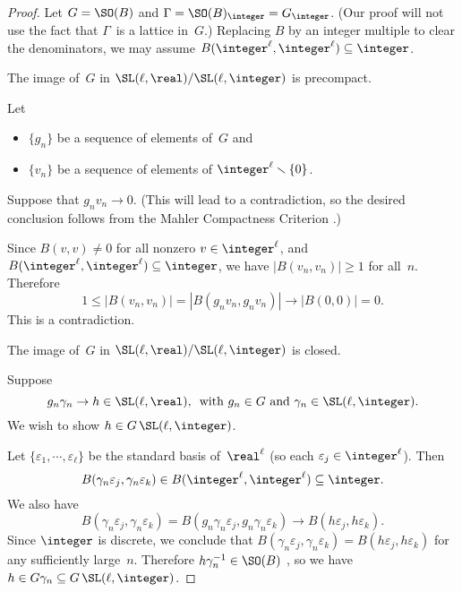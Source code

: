 \begin{proof}
 Let $G = \SO(B)$ and $\Gamma = \SO(B)_{\integer} = G_\integer$.
(Our proof will not use the fact that $\Gamma$~is a
lattice in~$G$.)
Replacing $B$ by an integer multiple to clear the
denominators, we may assume $B(\integer^\ell,\integer^\ell)
\subseteq \integer$.

\goodbreak %

\setcounter{step}{0}

\begin{step} \label{anis->cocpct-precpct}
 The image of~$G$ in\/ $\SL(\ell,\real)
/ \SL(\ell,\integer)$ is precompact.
 \end{step}
 Let 
 \begin{itemize}
 \item $\{g_n\}$ be a sequence of elements of~$G$ and
 \item $\{v_n\}$ be a sequence of elements of $\integer^\ell
\smallsetminus \{0\}$. 
 \end{itemize}
 Suppose that $g_n v_n \to 0$. (This will lead to a
contradiction, so the desired conclusion follows from the
Mahler Compactness Criterion .)

Since $B(v,v) \neq 0$ for all
nonzero $v \in \integer^\ell$, and $B(\integer^\ell,\integer^\ell)
\subseteq \integer$, we have $|B(v_n,v_n)| \ge 1$
for all~$n$. Therefore
 $$ 1 \le |B(v_n,v_n)| = |B(g_n v_n, g_n v_n)| \to |B(0,0)|
= 0 .$$
 This is a contradiction.

\begin{step} \label{anis->cocpct-closed}
 The image of~$G$ in\/ $\SL(\ell,\real) /
\SL(\ell,\integer)$ is closed.
 \end{step}
 Suppose 
 	$$ \text{$g_n \gamma_n \to h \in \SL(\ell,\real)$, \ with $g_n
\in G$ and $\gamma_n \in \SL(\ell,\integer)$} . $$
We wish to show $h \in G \, \SL(\ell,\integer)$.

Let $\{\varepsilon_1,\cdots,\varepsilon_\ell\}$ be the standard basis
of~$\real^\ell$ (so each $\varepsilon_j \in \integer^\ell$).  Then
 $$ B(\gamma_n \varepsilon_j, \gamma_n \varepsilon_k)
 \in B(\integer^\ell,\integer^\ell)
 \subseteq \integer .$$
 We also have
 $$ B(\gamma_n \varepsilon_j, \gamma_n \varepsilon_k)
 =  B(g_n \gamma_n \varepsilon_j, g_n \gamma_n \varepsilon_k)
 \to B(h \varepsilon_j, h \varepsilon_k) .$$
 Since $\integer$ is discrete, we conclude that
 $ B(\gamma_n \varepsilon_j, \gamma_n \varepsilon_k)
 = B(h \varepsilon_j, h \varepsilon_k) $
 for any sufficiently large~$n$.
 Therefore $h \gamma_n^{-1} \in \SO(B)$ ,
 so we have $h \in G \gamma_n \subseteq G \, \SL(\ell,\integer)$.


\end{proof}
